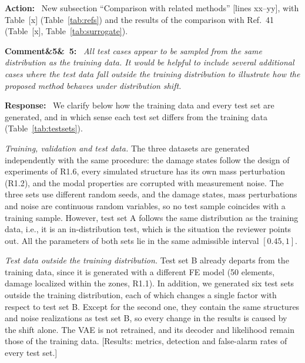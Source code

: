 \documentclass[11pt]{article}
\newenvironment{rcomment}[1]{\par\bigskip\noindent\textbf{Comment\ifx&#1&\else\ #1\fi:}\ \itshape}{\par}
\newenvironment{response}{\par\smallskip\noindent\color{resp}\textbf{Response:}\ }{\par}
\newenvironment{action}{\par\smallskip\noindent\color{resp}\textbf{Action:}\ }{\par}
\newcommand{\tbd}[1]{\textcolor{note}{\textsf{[#1]}}}
\newcommand{\lines}[1]{\tbd{lines #1}}
\begin{document}
\begin{action}
New subsection ``Comparison with related methods'' \lines{xx--yy}, with Table~\tbd{x} (Table~\ref{tab:refs}) and the
results of the comparison with Ref.~41 (Table~\tbd{x}, Table~\ref{tab:surrogate}).
\end{action}

\begin{rcomment}{5}
All test cases appear to be sampled from the same distribution as the training data. It would be helpful to include several additional cases where the test data fall outside the training distribution to illustrate how the proposed method behaves under distribution shift.
\end{rcomment}

\begin{response}
We clarify below how the training data and every test set are generated, and in which sense each test set differs from
the training data (Table~\ref{tab:testsets}).

\textit{Training, validation and test data.} The three datasets are generated independently with the same procedure: the
damage states follow the design of experiments of R1.6, every simulated structure has its own mass perturbation (R1.2), and
the modal properties are corrupted with measurement noise. The three sets use different random seeds, and the damage
states, mass perturbations and noise are continuous random variables, so no test sample coincides with a training
sample. However, test set A follows the same distribution as the training data, i.e., it is an in-distribution test,
which is the situation the reviewer points out. All the parameters of both sets lie in the same admissible interval
$[0.45,1]$.

\textit{Test data outside the training distribution.} Test set B already departs from the training data, since it is
generated with a different FE model (50 elements, damage localized within the zones, R1.1). In addition, we generated six
test sets outside the training distribution, each of which changes a single factor with respect to test set B. Except for
the second one, they contain the same structures and noise realizations as test set B, so every change in the results is
caused by the shift alone. The VAE is not retrained, and its decoder and likelihood remain those of the training data.
\tbd{Results: metrics, detection and false-alarm rates of every test set.}
\end{response}
\end{document}
